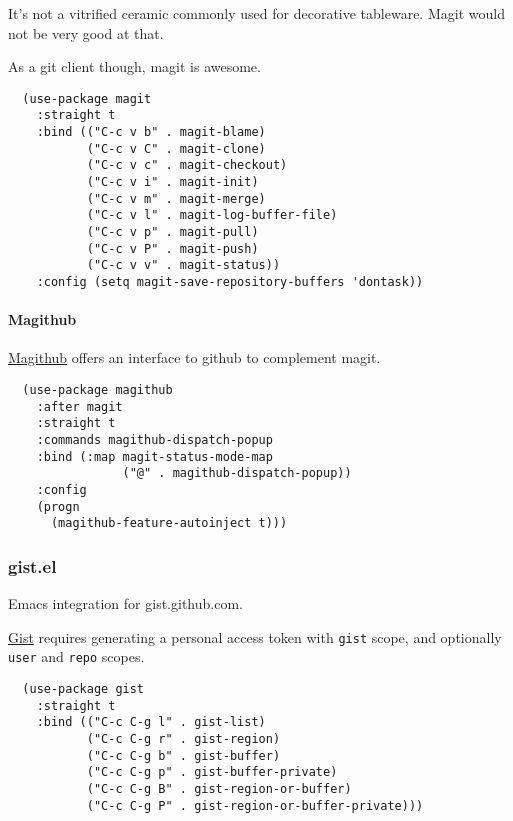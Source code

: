 \documentclass[11pt]{article}
\begin{document}
It's not a vitrified ceramic commonly used for decorative tableware.
Magit would not be very good at that.

As a git client though, magit is awesome.

\begin{verbatim}
  (use-package magit
    :straight t
    :bind (("C-c v b" . magit-blame)
           ("C-c v C" . magit-clone)
           ("C-c v c" . magit-checkout)
           ("C-c v i" . magit-init)
           ("C-c v m" . magit-merge)
           ("C-c v l" . magit-log-buffer-file)
           ("C-c v p" . magit-pull)
           ("C-c v P" . magit-push)
           ("C-c v v" . magit-status))
    :config (setq magit-save-repository-buffers 'dontask))
\end{verbatim}

\paragraph*{Magithub}
\label{sec:orgdcc6e12}

\href{https://github.com/vermiculus/github}{Magithub} offers an interface to github to complement magit.

\begin{verbatim}
  (use-package magithub
    :after magit
    :straight t
    :commands magithub-dispatch-popup
    :bind (:map magit-status-mode-map
                ("@" . magithub-dispatch-popup))
    :config
    (progn
      (magithub-feature-autoinject t)))
\end{verbatim}

\subsubsection*{gist.el}
\label{sec:org458843c}

Emacs integration for gist.github.com.

\href{https://github.com/defunkt/gist.el}{Gist} requires generating a personal access token with \texttt{gist} scope, and
optionally \texttt{user} and \texttt{repo} scopes.

\begin{verbatim}
  (use-package gist
    :straight t
    :bind (("C-c C-g l" . gist-list)
           ("C-c C-g r" . gist-region)
           ("C-c C-g b" . gist-buffer)
           ("C-c C-g p" . gist-buffer-private)
           ("C-c C-g B" . gist-region-or-buffer)
           ("C-c C-g P" . gist-region-or-buffer-private)))
\end{verbatim}
\end{document}
